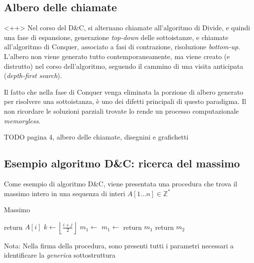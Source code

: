 \subsection{Albero delle chiamate}
\label{sss:alberochiamate}<++>
Nel corso del D\&C, si alternano chiamate all'algoritmo di Divide, e quindi una fase di espansione, generazione \textit{top-down} delle sottoistanze, e chiamate all'algoritmo di Conquer, associato a fasi di contrazione, risoluzione \textit{bottom-up}. L'albero non viene generato tutto contemporaneamente, ma viene creato (e distrutto) nel corso dell'algoritmo, seguendo il cammino di una visita anticipata (\textit{depth-first search}).

Il fatto che nella fase di Conquer venga eliminata la porzione di albero generato per risolvere una sottoistanza, è uno dei difetti principali di questo paradigma. Il non ricordare le soluzioni parziali trovate lo rende un processo computazionale \textit{memoryless}.

TODO pagina 4, albero delle chiamate, disegnini e grafichetti

\subsection{Esempio algoritmo D\&C: ricerca del massimo}

Come esempio di algoritmo D\&C, viene presentata una procedura che trova il massimo intero in una sequenza di interi $A[1 \dots n] \in \mathbb{Z}^*$

\begin{algorithm}[H]
\caption{Massimo}\label{alg:max}
\begin{algorithmic}[1]
                                     
            \State return $A[i]$
        \EndIf
        \State $k \gets \left\lfloor \frac{i+j}{2} \right\rfloor$    
        \State $m_1 \gets $  
        \State $m_1 \gets $ 
                      
            \State return $m_1$
        \Else
            \State return $m_2$
        \EndIf
    \EndProcedure
\end{algorithmic}
\end{algorithm}

Nota: Nella firma della procedura, sono presenti tutti i parametri necessari a identificare la \textit{generica} sottostruttura

